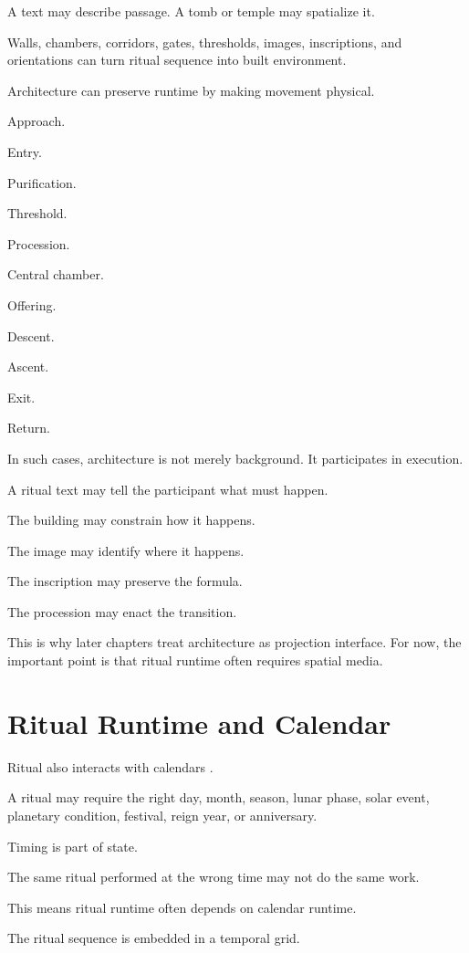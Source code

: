 \documentclass[11pt]{book}
\begin{document}
A text may describe passage. A tomb or temple may spatialize it.

Walls, chambers, corridors, gates, thresholds, images, inscriptions, and orientations can turn ritual sequence into built environment.

Architecture can preserve runtime by making movement physical.

Approach.

Entry.

Purification.

Threshold.

Procession.

Central chamber.

Offering.

Descent.

Ascent.

Exit.

Return.

In such cases, architecture is not merely background. It participates in execution.

A ritual text may tell the participant what must happen.

The building may constrain how it happens.

The image may identify where it happens.

The inscription may preserve the formula.

The procession may enact the transition.

This is why later chapters treat architecture as projection interface. For now, the important point is that ritual runtime often requires spatial media.

\section{Ritual Runtime and Calendar}

Ritual also interacts with calendars \cite{Parker1950CalendarsEgypt,Aveni1989EmpiresTime,Assmann2011CulturalMemory}.

A ritual may require the right day, month, season, lunar phase, solar event, planetary condition, festival, reign year, or anniversary.

Timing is part of state.

The same ritual performed at the wrong time may not do the same work.

This means ritual runtime often depends on calendar runtime.

The ritual sequence is embedded in a temporal grid.
\end{document}
